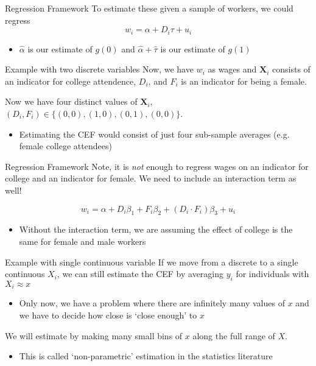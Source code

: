 \documentclass[aspectratio=169,t,11pt,table]{beamer}
\begin{document}
\begin{frame}{Regression Framework}
  To estimate these given a sample of workers, we could regress
  $$w_i = \alpha + D_i \tau + u_i$$
  
  \begin{itemize}
    \item $\hat{\alpha}$ is our estimate of $g(0)$ and $\hat{\alpha} + \hat{\tau}$ is our estimate of $g(1)$
  \end{itemize}
\end{frame}

\begin{frame}{Example with two discrete variables}
  Now, we have $w_i$ as wages and $\bm{X}_i$ consists of an indicator for college attendence, $D_i$, and $F_i$ is an indicator for being a female. 
  
  \bigskip
  Now we have four distinct values of $\bm{X}_i$, $(D_i, F_i) \in \{(0, 0), (1, 0), (0, 1), (0, 0)\}$. 
  \begin{itemize}
    \item Estimating the CEF would consist of just four sub-sample averages (e.g. female college attendees)
  \end{itemize}
\end{frame}

\begin{frame}{Regression Framework}
  Note, it is \emph{not} enough to regress wages on an indicator for college and an indicator for female. 
  We need to include an interaction term as well! 

  $$w_i = \alpha + D_i \beta_1 + F_i \beta_2 + (D_i \cdot F_i) \beta_3 + u_i$$
  
  \bigskip
  \begin{itemize}
    \item Without the interaction term, we are assuming the effect of college is the same for female and male workers
  \end{itemize}
\end{frame}

\begin{frame}{Example with single continuous variable}
  If we move from a discrete to a single continuous $X_i$, we can still estimate the CEF by averaging $y_i$ for individuals with $X_i \approx x$
  \begin{itemize}
    \item Only now, we have a problem where there are infinitely many values of $x$ and we have to decide how close is `close enough' to $x$
  \end{itemize}

  \bigskip
  We will estimate by making many small bins of $x$ along the full range of $X$. 
  \begin{itemize}
    \item This is called `non-parametric' estimation in the statistics literature
  \end{itemize}
\end{frame}
\end{document}
